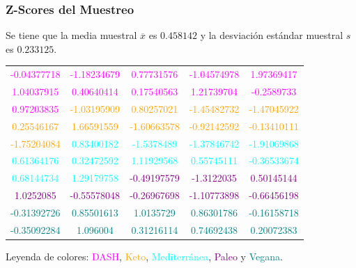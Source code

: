 \documentclass[12pt,a4paper]{article}
\begin{document}
    \subsubsection{Z-Scores del Muestreo}
        Se tiene que la media muestral $\overline{x}$ es $0.458142$ y la 
        desviación estándar muestral $s$ es $0.233125$.
        \begin{center}
            \begin{tabular}{ccccc}
                \textcolor{magenta}{-0.04377718} & \textcolor{magenta}{-1.18234679} & \textcolor{magenta}{ 0.77731576} & \textcolor{magenta}{-1.04574978} & \textcolor{magenta}{ 1.97369417} \\
                \textcolor{magenta}{ 1.04037915} & \textcolor{magenta}{ 0.40640414} & \textcolor{magenta}{ 0.17540563} & \textcolor{magenta}{ 1.21739704} & \textcolor{magenta}{-0.2589733}  \\
                \textcolor{magenta}{ 0.97203835} & \textcolor{orange}{-1.03195909} & \textcolor{orange}{ 0.80257021} & \textcolor{orange}{-1.45482732} & \textcolor{orange}{-1.47045922} \\
                \textcolor{orange}{ 0.25546167} & \textcolor{orange}{ 1.66591559} & \textcolor{orange}{-1.60663578} & \textcolor{orange}{-0.92142592} & \textcolor{orange}{-0.13410111} \\
                \textcolor{orange}{-1.75204084} & \textcolor{cyan}{ 0.83400182} & \textcolor{cyan}{-1.5378489}  & \textcolor{cyan}{-1.37846742} & \textcolor{cyan}{-1.91069868} \\
                \textcolor{cyan}{ 0.61364176} & \textcolor{cyan}{ 0.32472592} & \textcolor{cyan}{ 1.11929568} & \textcolor{cyan}{ 0.55745111} & \textcolor{cyan}{-0.36533674} \\
                \textcolor{cyan}{ 0.68144734} & \textcolor{cyan}{ 1.29179758} & \textcolor{purple}{-0.49197579} & \textcolor{purple}{-1.3122035}  & \textcolor{purple}{ 0.50145144} \\
                \textcolor{purple}{ 1.0252085}  & \textcolor{purple}{-0.55578048} & \textcolor{purple}{-0.26967698} & \textcolor{purple}{-1.10773898} & \textcolor{purple}{-0.66456198} \\
                \textcolor{teal}{-0.31392726} & \textcolor{teal}{ 0.85501613} & \textcolor{teal}{ 1.0135729}  & \textcolor{teal}{ 0.86301786} & \textcolor{teal}{-0.16158718} \\
                \textcolor{teal}{-0.35092284} & \textcolor{teal}{ 1.096004}   & \textcolor{teal}{ 0.31216114} & \textcolor{teal}{ 0.74692438} & \textcolor{teal}{ 0.20072383} \\
            \end{tabular}
        \end{center}
        Leyenda de colores: \textcolor{magenta}{DASH}, \textcolor{orange}{Keto}, \textcolor{cyan}{Mediterránea}, 
        \textcolor{purple}{Paleo} y \textcolor{teal}{Vegana}.
\end{document}
